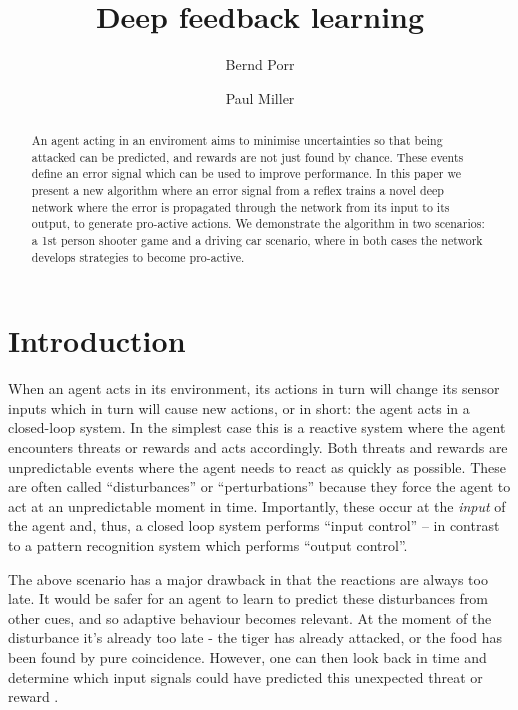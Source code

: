 \documentclass{llncs}
\title{Deep feedback learning}
\author{Bernd Porr \and Paul Miller}
\institute{Glasgow Neuro LTD, United Kingdom\\
  \email{bernd@glasgowneuro.tech}\\
  \email{paul@glasgowneuro.tech}}
\begin{document}
\maketitle

\begin{abstract}
  An agent acting in an enviroment aims to minimise uncertainties so
  that being attacked can be predicted, and rewards are not just
  found by chance. These events define an error signal which can be used to
  improve performance. In this paper we present a new algorithm where an
  error signal from a reflex trains a novel deep network where the error is
  propagated through the network from its input to its output, to generate pro-active
  actions. We demonstrate the algorithm in two scenarios: a 1st person
  shooter game and a driving car scenario, where in both cases the network
  develops strategies to become pro-active.
\end{abstract}

\section{Introduction}
When an agent acts in its environment, its actions in turn will
change its sensor inputs which in turn will cause new actions, or in
short: the agent acts in a closed-loop system. In the simplest case this
is a reactive system where the agent encounters threats or rewards and
acts accordingly. Both threats and rewards are unpredictable events
where the agent needs to react as quickly as possible. These are often 
called ``disturbances'' or ``perturbations'' because they force
the agent to act at an unpredictable moment in time. Importantly, these
occur at the \textsl{input} of the agent and, thus, a closed loop system
performs ``input control'' -- in contrast to a pattern recognition system
which performs ``output control''.

The above scenario has a major drawback in that the reactions are always
too late.  It would be safer for an agent to learn to predict these
disturbances from other cues, and so adaptive behaviour becomes
relevant. At the moment of the disturbance it's already too late - the
tiger has already attacked, or the food has been found by pure
coincidence. However, one can then look back in time and determine
which input signals could have predicted this unexpected
threat or reward \cite{Sutton98,Woergoetter2005,PorrNecoInvco2003}.
\end{document}

